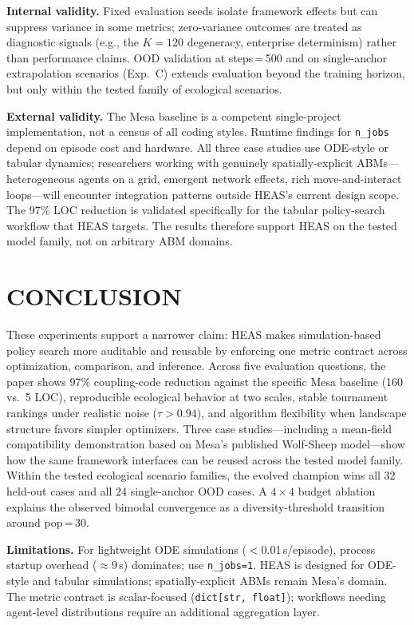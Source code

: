 \documentclass{wscpaperproc}
\begin{document}
\textbf{Internal validity.} Fixed evaluation seeds isolate framework effects
but can suppress variance in some metrics; zero-variance outcomes are treated as
diagnostic signals (e.g., the $K\!=\!120$ degeneracy, enterprise determinism)
rather than performance claims. OOD validation at steps\,=\,500 and on
single-anchor extrapolation scenarios (Exp.~C) extends evaluation beyond the
training horizon, but only within the tested family of ecological scenarios.

\textbf{External validity.} The Mesa baseline is a competent single-project
implementation, not a census of all coding styles. Runtime findings for
\texttt{n\_jobs} depend on episode cost and hardware. All three case studies
use ODE-style or tabular dynamics; researchers working with genuinely
spatially-explicit ABMs---heterogeneous agents on a grid, emergent network
effects, rich move-and-interact loops---will encounter integration patterns
outside HEAS's current design scope. The 97\% LOC reduction is validated
specifically for the tabular policy-search workflow that HEAS targets. The
results therefore support HEAS on the tested model family, not on arbitrary ABM
domains.

\section{CONCLUSION}

These experiments support a narrower claim: HEAS makes simulation-based policy
search more auditable and reusable by enforcing one metric contract across
optimization, comparison, and inference. Across five evaluation questions, the
paper shows 97\% coupling-code reduction against the specific Mesa baseline
(160 vs.\ 5 LOC), reproducible ecological behavior at two scales, stable
tournament rankings under realistic noise ($\tau\!>\!0.94$), and algorithm
flexibility when landscape structure favors simpler optimizers. Three case
studies---including a mean-field compatibility demonstration based on Mesa's
published Wolf-Sheep model---show how the same framework interfaces can be
reused across the tested model family. Within the tested ecological scenario
families, the evolved champion wins all 32 held-out cases and all 24
single-anchor OOD cases. A $4\!\times\!4$ budget ablation explains the observed
bimodal convergence as a diversity-threshold transition around pop\,=\,30.

\textbf{Limitations.} For lightweight ODE simulations ($<$0.01\,s/episode),
process startup overhead ($\approx$9\,s) dominates; use \texttt{n\_jobs=1}.
HEAS is designed for ODE-style and tabular simulations; spatially-explicit ABMs
remain Mesa's domain. The metric contract is scalar-focused
(\texttt{dict[str, float]}); workflows needing agent-level distributions require
an additional aggregation layer.
\end{document}
